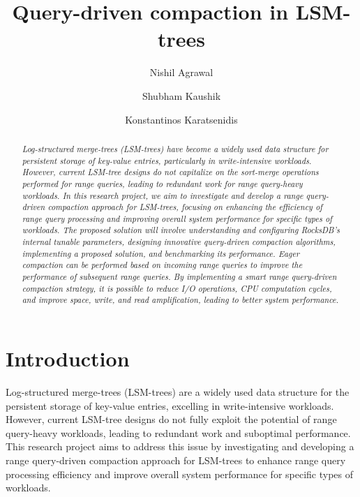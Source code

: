 \documentclass[balance=false, sigconf]{acmart}
\begin{document}
\title{Query-driven compaction in LSM-trees}

\author{Nishil Agrawal}
\author{Shubham Kaushik}
\author{Konstantinos Karatsenidis}


\begin{abstract}
\textit{Log-structured merge-trees (LSM-trees)\cite{oneil1996logstructured, dayan2017monkey} have become a widely used data structure 
for persistent storage of key-value entries, particularly in write-intensive workloads. 
However, current LSM-tree designs do not capitalize on the sort-merge operations performed 
for range queries, leading to redundant work for range query-heavy workloads. In this 
research project, we aim to investigate and develop a range query-driven compaction approach 
for LSM-trees, focusing on enhancing the efficiency of range query processing and improving 
overall system performance for specific types of workloads. The proposed solution will 
involve understanding and configuring RocksDB's internal tunable parameters, designing innovative query-driven 
compaction algorithms, implementing a proposed solution, and benchmarking its
performance. Eager compaction can be performed based on incoming range queries to improve the performance of subsequent range queries. By implementing a smart range query-driven compaction strategy, it is possible 
to reduce I/O operations, CPU computation cycles, and improve space, write, and read 
amplification, leading to better system performance.}
\end{abstract}

\maketitle
\pagestyle{plain}

\section{Introduction}

Log-structured merge-trees (LSM-trees) are a widely used data structure for the persistent storage of key-value entries, excelling in write-intensive workloads. However, current LSM-tree designs do not fully exploit the potential of range query-heavy workloads, leading to redundant work and suboptimal performance. This research project aims to address this issue by investigating and developing a range query-driven compaction approach for LSM-trees to enhance range query processing efficiency and improve overall system performance for specific types of workloads.
\end{document}
